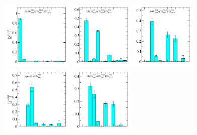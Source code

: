 \begin{figure}
  \includegraphics[width=0.304\textwidth]{figures/spectrum_a1g/with_tq/zfactors/zfactor_isodoublet_kaon_pion-A1g_1-P000-A1u-SS_0-P000-A1um-SS_0.pdf}
  \includegraphics[width=0.28\textwidth]{figures/spectrum_a1g/with_tq/zfactors/zfactor_isodoublet_kaon_pion-A1g_1-P001-A2-SS_1-P00-1-A2m-SS_1.pdf}
  \includegraphics[width=0.28\textwidth]{figures/spectrum_a1g/with_tq/zfactors/zfactor_isodoublet_kaon_eta-A1g_1-P000-A1u-SS_0-P000-A1up-SS_0.pdf}\\
  \includegraphics[width=0.304\textwidth]{figures/spectrum_a1g/with_tq/zfactors/zfactor_tqsuss2m-P000-A1g_1-SS_2.pdf}
  \includegraphics[width=0.28\textwidth]{figures/spectrum_a1g/with_tq/zfactors/zfactor_isodoublet_kaon_phi-A1g_1-P000-A1u-SS_0-P000-A1up-SS_0.pdf}

\end{figure}
